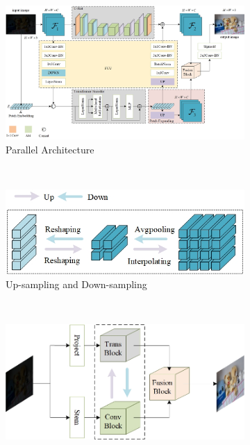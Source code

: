 \documentclass[a4paper]{ctexart}
\begin{document}
	\begin{figure}[htb] 
		\centering 		
		\begin{subfigure}{\textwidth}
			\includegraphics[width=\linewidth]{picture/LLIE/My Architecture/The proposed initial architecture.jpg}
			\captionsetup{font=scriptsize}
			\caption{Parallel Architecture}
			\label{fig: First Architecture}
		\end{subfigure}\\
		\begin{subfigure}{0.4\textwidth}
			\includegraphics[width=\linewidth]{picture/LLIE/My Architecture/Up-sampling and down-sampling}
			\captionsetup{font=scriptsize}
			\caption{Up-sampling and Down-sampling}
			\label{fig: Up-sampling and down-sampling}
		\end{subfigure} \
		\begin{subfigure}{0.4\textwidth}
			\includegraphics[width=\linewidth]{picture/LLIE/My Architecture/The proposed initial architecture(Abstract Picture)}

\end{subfigure}
\end{figure}
\end{document}
